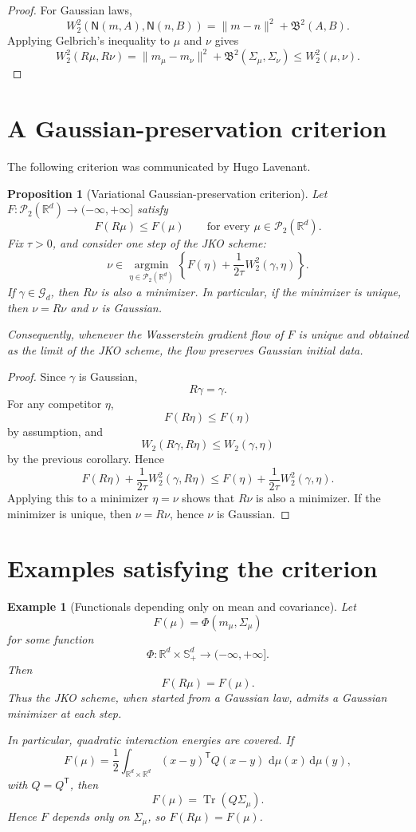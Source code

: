 \documentclass[11pt]{article}
\newtheorem{proposition}{Proposition}
\newtheorem{example}{Example}
\DeclareMathOperator{\Tr}{Tr}
\newcommand{\R}{\mathbb R}
\newcommand{\W}{W}
\newcommand{\N}{\mathsf N}
\newcommand{\dd}{\,\mathrm d}
\begin{document}
\begin{proof}
For Gaussian laws,
\[
\W_2^2(\N(m,A),\N(n,B))
=
\|m-n\|^2+\mathfrak B^2(A,B).
\]
Applying Gelbrich's inequality to $\mu$ and $\nu$ gives
\[
\W_2^2(R\mu,R\nu)
=
\|m_\mu-m_\nu\|^2+\mathfrak B^2(\Sigma_\mu,\Sigma_\nu)
\le
\W_2^2(\mu,\nu).
\]
\end{proof}

\section{A Gaussian-preservation criterion}

The following criterion was communicated by Hugo Lavenant.

\begin{proposition}[Variational Gaussian-preservation criterion]
Let $F:\mathcal P_2(\R^d)\to(-\infty,+\infty]$ satisfy
\[
F(R\mu)\le F(\mu)
\qquad
\text{for every }\mu\in\mathcal P_2(\R^d).
\]
Fix $\tau>0$, and consider one step of the JKO scheme:
\[
\nu\in\operatorname*{argmin}_{\eta\in\mathcal P_2(\R^d)}
\left\{
F(\eta)+\frac{1}{2\tau}\W_2^2(\gamma,\eta)
\right\}.
\]
If $\gamma\in\mathcal G_d$, then $R\nu$ is also a minimizer. In particular, if the minimizer is unique, then $\nu=R\nu$ and $\nu$ is Gaussian.

Consequently, whenever the Wasserstein gradient flow of $F$ is unique and obtained as the limit of the JKO scheme, the flow preserves Gaussian initial data.
\end{proposition}

\begin{proof}
Since $\gamma$ is Gaussian,
\[
R\gamma=\gamma.
\]
For any competitor $\eta$,
\[
F(R\eta)\le F(\eta)
\]
by assumption, and
\[
\W_2(R\gamma,R\eta)\le \W_2(\gamma,\eta)
\]
by the previous corollary. Hence
\[
F(R\eta)+\frac{1}{2\tau}\W_2^2(\gamma,R\eta)
\le
F(\eta)+\frac{1}{2\tau}\W_2^2(\gamma,\eta).
\]
Applying this to a minimizer $\eta=\nu$ shows that $R\nu$ is also a minimizer. If the minimizer is unique, then $\nu=R\nu$, hence $\nu$ is Gaussian.
\end{proof}

\section{Examples satisfying the criterion}

\begin{example}[Functionals depending only on mean and covariance]
Let
\[
F(\mu)=\Phi(m_\mu,\Sigma_\mu)
\]
for some function
\[
\Phi:\R^d\times\mathbb S_+^d\to(-\infty,+\infty].
\]
Then
\[
F(R\mu)=F(\mu).
\]
Thus the JKO scheme, when started from a Gaussian law, admits a Gaussian minimizer at each step.

In particular, quadratic interaction energies are covered. If
\[
F(\mu)
=
\frac12\int_{\R^d\times\R^d}(x-y)^{\mathsf T}Q(x-y)\,\dd\mu(x)\dd\mu(y),
\]
with $Q=Q^{\mathsf T}$, then
\[
F(\mu)=\Tr(Q\Sigma_\mu).
\]
Hence $F$ depends only on $\Sigma_\mu$, so $F(R\mu)=F(\mu)$.
\end{example}
\end{document}
